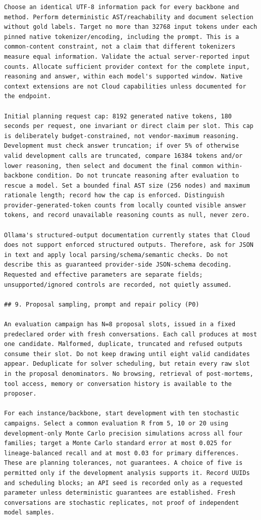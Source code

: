 \documentclass[11pt,a4paper]{article}
\begin{document}
\begin{verbatim}
Choose an identical UTF-8 information pack for every backbone and method. Perform deterministic AST/reachability and document selection without gold labels. Target no more than 32768 input tokens under each pinned native tokenizer/encoding, including the prompt. This is a common-content constraint, not a claim that different tokenizers measure equal information. Validate the actual server-reported input counts. Allocate sufficient provider context for the complete input, reasoning and answer, within each model's supported window. Native context extensions are not Cloud capabilities unless documented for the endpoint.

Initial planning request cap: 8192 generated native tokens, 180 seconds per request, one invariant or direct claim per slot. This cap is deliberately budget-constrained, not vendor-maximum reasoning. Development must check answer truncation; if over 5% of otherwise valid development calls are truncated, compare 16384 tokens and/or lower reasoning, then select and document the final common within-backbone condition. Do not truncate reasoning after evaluation to rescue a model. Set a bounded final AST size (256 nodes) and maximum rationale length; record how the cap is enforced. Distinguish provider-generated-token counts from locally counted visible answer tokens, and record unavailable reasoning counts as null, never zero.

Ollama's structured-output documentation currently states that Cloud does not support enforced structured outputs. Therefore, ask for JSON in text and apply local parsing/schema/semantic checks. Do not describe this as guaranteed provider-side JSON-schema decoding. Requested and effective parameters are separate fields; unsupported/ignored controls are recorded, not quietly assumed.

## 9. Proposal sampling, prompt and repair policy (P0)

An evaluation campaign has N=8 proposal slots, issued in a fixed predeclared order with fresh conversations. Each call produces at most one candidate. Malformed, duplicate, truncated and refused outputs consume their slot. Do not keep drawing until eight valid candidates appear. Deduplicate for solver scheduling, but retain every raw slot in the proposal denominators. No browsing, retrieval of post-mortems, tool access, memory or conversation history is available to the proposer.

For each instance/backbone, start development with ten stochastic campaigns. Select a common evaluation R from 5, 10 or 20 using development-only Monte Carlo precision simulations across all four families; target a Monte Carlo standard error at most 0.025 for lineage-balanced recall and at most 0.03 for primary differences. These are planning tolerances, not guarantees. A choice of five is permitted only if the development analysis supports it. Record UUIDs and scheduling blocks; an API seed is recorded only as a requested parameter unless deterministic guarantees are established. Fresh conversations are stochastic replicates, not proof of independent model samples.


\end{verbatim}
\end{document}
